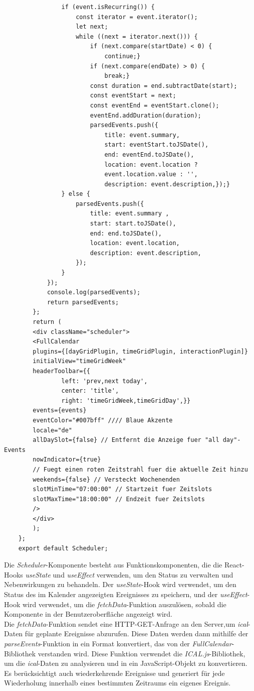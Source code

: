 \begin{lstlisting}
				if (event.isRecurring()) {
					const iterator = event.iterator();
					let next;
					while ((next = iterator.next())) {
						if (next.compare(startDate) < 0) {
							continue;}
						if (next.compare(endDate) > 0) {
							break;}
						const duration = end.subtractDate(start);
						const eventStart = next;
						const eventEnd = eventStart.clone();
						eventEnd.addDuration(duration);
						parsedEvents.push({
							title: event.summary,
							start: eventStart.toJSDate(),
							end: eventEnd.toJSDate(),
							location: event.location ? 
							event.location.value : '',
							description: event.description,});}
				} else {
					parsedEvents.push({
						title: event.summary ,
						start: start.toJSDate(),
						end: end.toJSDate(),
						location: event.location,
						description: event.description,
					});
				}
			});
			console.log(parsedEvents);
			return parsedEvents;
		};
		return (
		<div className="scheduler">
		<FullCalendar
		plugins={[dayGridPlugin, timeGridPlugin, interactionPlugin]}
		initialView="timeGridWeek"
		headerToolbar={{
				left: 'prev,next today',
				center: 'title',
				right: 'timeGridWeek,timeGridDay',}}
		events={events}
		eventColor="#007bff" //// Blaue Akzente
		locale="de"
		allDaySlot={false} // Entfernt die Anzeige fuer "all day"-Events
		nowIndicator={true} 
		// Fuegt einen roten Zeitstrahl fuer die aktuelle Zeit hinzu
		weekends={false} // Versteckt Wochenenden
		slotMinTime="07:00:00" // Startzeit fuer Zeitslots
		slotMaxTime="18:00:00" // Endzeit fuer Zeitslots
		/>
		</div>
		);
	};
	export default Scheduler;
\end{lstlisting}
Die \emph{Scheduler}-Komponente besteht aus Funktionskomponenten, die die React-Hooks \emph{useState} und \emph{useEffect} verwenden, um den Status zu verwalten und Nebenwirkungen zu behandeln. Der \emph{useState}-Hook wird verwendet, um den Status des im Kalender angezeigten Ereignisses zu speichern,  und der \emph{useEffect}-Hook wird verwendet, um die \emph{fetchData}-Funktion auszulösen, sobald die Komponente in der Benutzeroberfläche angezeigt wird.\\
Die \emph{fetchData}-Funktion sendet eine HTTP-GET-Anfrage an den Server,um \emph{ical}-Daten für geplante Ereignisse abzurufen. Diese Daten werden dann mithilfe der \emph{parseEvents}-Funktion in ein Format konvertiert, das von der \emph{FullCalendar}-Bibliothek verstanden wird. Diese Funktion verwendet die \emph{ICAL.js}-Bibliothek, um die \emph{ical}-Daten zu analysieren und in ein JavaScript-Objekt zu konvertieren. Es berücksichtigt auch wiederkehrende Ereignisse und generiert für jede Wiederholung innerhalb eines bestimmten Zeitraums ein eigenes Ereignis.\\
